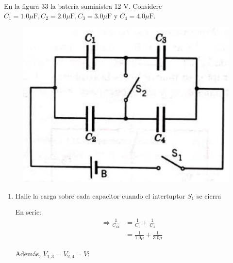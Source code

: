 \begin{problema}
    En la figura 33 la batería suministra 12 V. Considere $C_{1}=1.0 \mu \mathrm{F}, C_{2}=2.0 \mu \mathrm{F}, C_{3}=3.0 \mu \mathrm{F}$ y $C_{4}=4.0 \mu \mathrm{F}$.
    \begin{figure}[H]
        \centering
        \includegraphics[scale=0.3]{imagenes/1.jpg}
    \end{figure}
    \begin{enumerate}
        \item Halle la carga sobre cada capacitor cuando el intertuptor $S_{1}$ se cierra 
        \begin{sol}En serie:
            $$
\begin{aligned}
\Rightarrow  \frac{1}{C_{13}} & =\frac{1}{C_{1}}+\frac{1}{C_{3}} \\
& =\frac{1}{1.0 \mu}+\frac{1}{3.0 \mu}
\end{aligned}
$$


Además, $V_{1,3}=V_{2,4}=V$: 


\end{sol}
\end{enumerate}
\end{problema}
